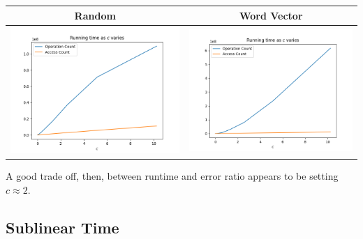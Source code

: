 \documentclass[
]{article}
\begin{document}
\begin{longtable}[]{@{}cc@{}}
\toprule()
Random & Word Vector \\
\midrule()
\endhead
\includegraphics{images/running_time_as_c_varies.png}
&
\includegraphics{images/running_time_as_c_varies_word_vector.png} \\
\bottomrule()
\end{longtable}

A good trade off, then, between runtime and error ratio appears to be
setting {\(c \approx 2\)}.

\hypertarget{sublinear-time}{%
\subsection{Sublinear Time}\label{sublinear-time}}
\end{document}
